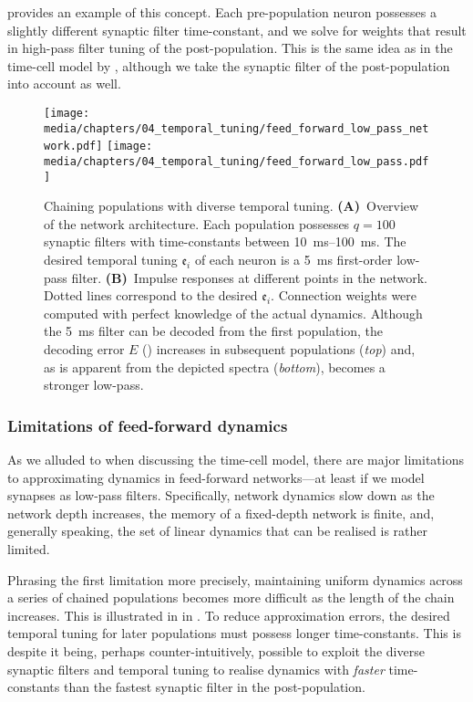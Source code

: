  provides an example of this concept.
Each pre-population neuron possesses a slightly different synaptic filter time-constant, and we solve for weights that result in high-pass filter tuning of the post-population.
This is the same idea as in the time-cell model by \citet{howard2014unified}, although we take the synaptic filter of the post-population into account as well.

\begin{figure}[p]
	\centering
	\texttt{[image: media/chapters/04\_temporal\_tuning/feed\_forward\_low\_pass\_network.pdf]}
	\texttt{[image: media/chapters/04\_temporal\_tuning/feed\_forward\_low\_pass.pdf]}
	\caption[Chaining populations with diverse temporal tuning]{Chaining populations with diverse temporal tuning. \textbf{(A)}~Overview of the network architecture. Each population possesses $q = 100$ synaptic filters with time-constants between \SIrange{10}{100}{\milli\second}.
	The desired temporal tuning $\mathfrak{e}_i$ of each neuron is a \SI{5}{\milli\second} first-order low-pass filter.
	\textbf{(B)}~Impulse responses at different points in the network.
	Dotted lines correspond to the desired $\mathfrak{e}_i$.
	Connection weights were computed with perfect knowledge of the actual dynamics.
	Although the \SI{5}{\milli\second} filter can be decoded from the first population, the decoding error $E$ (\NRMSE) increases in subsequent populations (\emph{top}) and, as is apparent from the depicted spectra (\emph{bottom}), becomes a stronger low-pass.
	\label{fig:feed_forward_low_pass}
	}
\end{figure}

\subsubsection{Limitations of feed-forward dynamics}
As we alluded to when discussing the \citet{howard2014unified} time-cell model, there are major limitations to approximating dynamics in feed-forward networks---at least if we model synapses as low-pass filters.
Specifically, network dynamics slow down as the network depth increases, the memory of a fixed-depth network is finite, and, generally speaking, the set of linear dynamics that can be realised is rather limited.

Phrasing the first limitation more precisely, maintaining uniform dynamics across a series of chained populations becomes more difficult as the length of the chain increases.
This is illustrated in in .
To reduce approximation errors, the desired temporal tuning for later populations must possess longer time-constants.
This is despite it being, perhaps counter-intuitively, possible to exploit the diverse synaptic filters and temporal tuning to realise dynamics with \emph{faster} time-constants than the fastest synaptic filter in the post-population.

